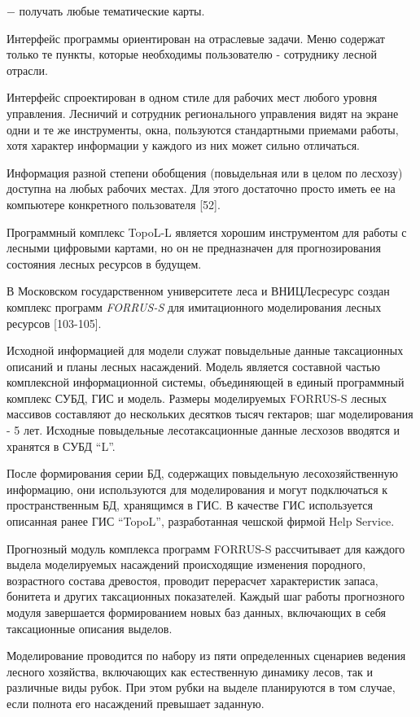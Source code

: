 \documentclass{article}
\begin{document}
\ensuremath{-} получать любые тематические карты.

Интерфейс программы ориентирован на отраслевые 
задачи. Меню содержат только те пункты, которые 
необходимы пользователю - сотруднику лесной 
отрасли. 

Интерфейс спроектирован в одном стиле для рабочих 
мест любого уровня управления. Лесничий и сотрудник 
регионального управления видят на экране одни 
и те же инструменты, окна, пользуются стандартными 
приемами работы, хотя характер информации у 
каждого из них может сильно отличаться. 

Информация разной степени обобщения (повыдельная 
или в целом по лесхозу) доступна на любых рабочих 
местах. Для этого достаточно просто иметь ее 
на компьютере конкретного пользователя [52].

Программный комплекс TopoL-L является хорошим 
инструментом для работы с лесными цифровыми 
картами, но он не предназначен для прогнозирования 
состояния лесных ресурсов в будущем.

В Московском государственном университете 
леса и ВНИЦЛесресурс создан комплекс программ 
\textit{FORRUS-S} для имитационного моделирования 
лесных ресурсов [103-105]. 

Исходной информацией для модели служат повыдельные 
данные таксационных описаний и планы лесных 
насаждений. Модель является составной частью 
комплексной информационной системы, объединяющей 
в единый программный комплекс СУБД, ГИС и модель. 
Размеры моделируемых FORRUS-S лесных массивов 
составляют до нескольких десятков тысяч гектаров; 
 шаг моделирования - 5 лет. Исходные повыдельные 
лесотаксационные данные лесхозов вводятся 
и хранятся в СУБД ``L''. 

После формирования серии БД, содержащих повыдельную 
лесохозяйственную информацию, они используются 
для моделирования и могут подключаться к пространственным 
БД, хранящимся в ГИС. В  качестве ГИС используется 
описанная ранее ГИС ``TopoL'', разработанная чешской 
фирмой Help Service.

Прогнозный модуль комплекса программ FORRUS-S 
рассчитывает  для каждого выдела моделируемых 
насаждений происходящие изменения породного, 
возрастного состава древостоя, проводит перерасчет 
характеристик запаса, бонитета и других таксационных 
показателей. Каждый шаг работы прогнозного 
модуля завершается формированием новых  баз 
данных, включающих в себя таксационные описания 
выделов.

Моделирование проводится по набору из пяти 
определенных сценариев ведения лесного хозяйства, 
включающих как естественную динамику лесов, 
так и различные виды рубок. При этом рубки на 
выделе планируются в том случае, если полнота 
его насаждений превышает заданную.
\end{document}
